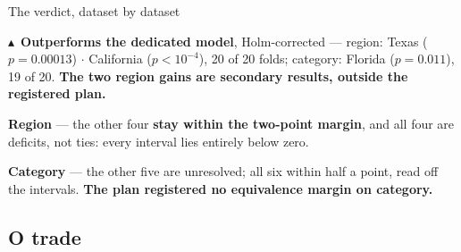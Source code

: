 \documentclass{beamer}
\begin{document}
\begin{frame}{The verdict, dataset by dataset}
    {\scriptsize
    {\color{primaryshade}$\blacktriangle$}~\textbf{Outperforms the dedicated model}, Holm-corrected
    --- region: Texas ($p=0.00013$) $\cdot$ California ($p<10^{-4}$), 20 of 20 folds;
    category: Florida ($p=0.011$), 19 of 20.
    \textbf{The two region gains are secondary results, outside the registered plan.}\par
    \textbf{Region} --- the other four \textbf{stay within the two-point margin}, and
    \alert{all four are deficits, not ties}: every interval lies entirely below zero.\par
    \textbf{Category} --- the other five are \alert{unresolved}; all six within half a point,
    read off the intervals. \textbf{The plan registered no equivalence margin on category.}\par}
\end{frame}

\subsection{O trade}
\end{document}
